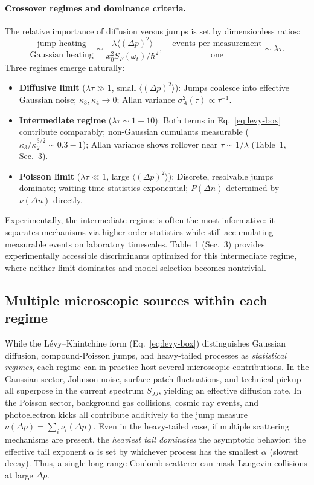 \paragraph{Crossover regimes and dominance criteria.}
The relative importance of diffusion versus jumps is set by dimensionless ratios:
\begin{equation}
\frac{\text{jump heating}}{\text{Gaussian heating}} 
\sim \frac{\lambda \langle (\Delta p)^2 \rangle}{x_0^2 S_F(\omega_t)/\hbar^2},
\quad
\frac{\text{events per measurement}}{\text{one}} 
\sim \lambda \tau.
\end{equation}
Three regimes emerge naturally:
\begin{itemize}
\item \textbf{Diffusive limit} ($\lambda \tau \gg 1$, small $\langle(\Delta p)^2\rangle$): 
  Jumps coalesce into effective Gaussian noise; 
  $\kappa_3, \kappa_4 \to 0$; 
  Allan variance $\sigma_A^2(\tau) \propto \tau^{-1}$.
\item \textbf{Intermediate regime} ($\lambda \tau \sim 1{-}10$): 
  Both terms in Eq.~\eqref{eq:levy-box} contribute comparably; 
  non-Gaussian cumulants measurable ($\kappa_3/\kappa_2^{3/2} \sim 0.3{-}1$); 
  Allan variance shows rollover near $\tau \sim 1/\lambda$ 
  (Table~1, Sec.~3).
\item \textbf{Poisson limit} ($\lambda \tau \ll 1$, large $\langle(\Delta p)^2\rangle$): 
  Discrete, resolvable jumps dominate; 
  waiting-time statistics exponential; 
  $P(\Delta n)$ determined by $\nu(\Delta n)$ directly.
\end{itemize}
Experimentally, the intermediate regime is often the most informative: 
it separates mechanisms via higher-order statistics while still accumulating 
measurable events on laboratory timescales.
Table~1 (Sec.~3) provides experimentally accessible discriminants 
optimized for this intermediate regime, where neither limit dominates 
and model selection becomes nontrivial.

\subsection{Multiple microscopic sources within each regime}
While the L\'evy--Khintchine form (Eq.~\ref{eq:levy-box}) distinguishes 
Gaussian diffusion, compound-Poisson jumps, and heavy-tailed processes as 
\emph{statistical regimes}, each regime can in practice host several 
microscopic contributions. In the Gaussian sector, Johnson noise, surface 
patch fluctuations, and technical pickup all superpose in the current 
spectrum $S_{JJ}$, yielding an effective diffusion rate. In the Poisson 
sector, background gas collisions, cosmic ray events, and photoelectron 
kicks all contribute additively to the jump measure 
$\nu(\Delta p) = \sum_i \nu_i(\Delta p)$. 
Even in the heavy-tailed case, if multiple scattering mechanisms are present, 
the \emph{heaviest tail dominates} the asymptotic behavior: the effective 
tail exponent $\alpha$ is set by whichever process has the smallest $\alpha$ 
(slowest decay). Thus, a single long-range Coulomb scatterer can mask 
Langevin collisions at large $\Delta p$.

